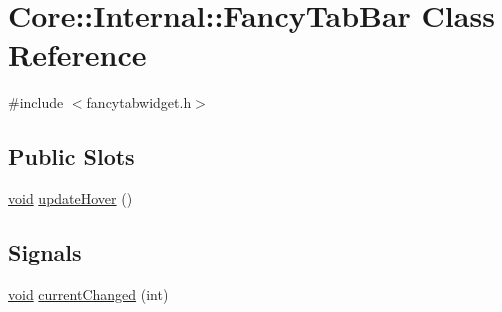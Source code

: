 \hypertarget{class_core_1_1_internal_1_1_fancy_tab_bar}{\section{\-Core\-:\-:\-Internal\-:\-:\-Fancy\-Tab\-Bar \-Class \-Reference}
\label{class_core_1_1_internal_1_1_fancy_tab_bar}
}


{\ttfamily \#include $<$fancytabwidget.\-h$>$}

\subsection*{\-Public \-Slots}
\begin{DoxyCompactItemize}
\item 
\hyperlink{group___u_a_v_objects_plugin_ga444cf2ff3f0ecbe028adce838d373f5c}{void} \hyperlink{group___core_plugin_gaebba5e848c986c159a23e73619bb0fa8}{update\-Hover} ()
\end{DoxyCompactItemize}
\subsection*{\-Signals}
\begin{DoxyCompactItemize}
\item 
\hyperlink{group___u_a_v_objects_plugin_ga444cf2ff3f0ecbe028adce838d373f5c}{void} \hyperlink{group___core_plugin_ga15690cddfb9374c7357649e92af3e12b}{current\-Changed} (int)
\end{DoxyCompactItemize}
